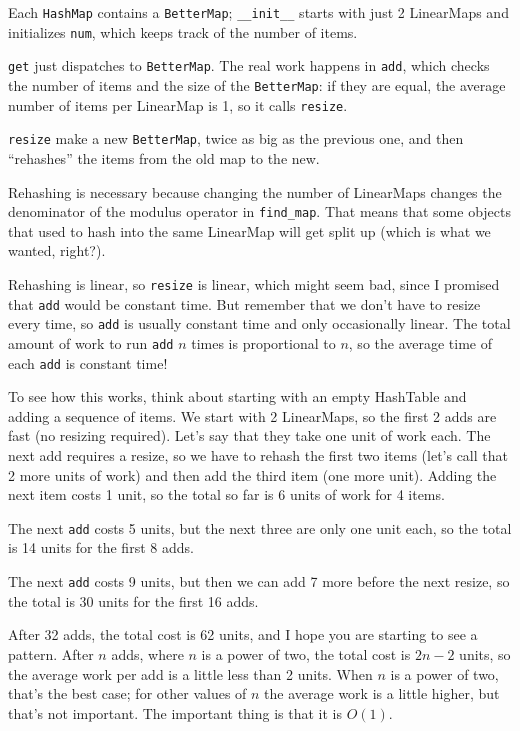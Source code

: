 \documentclass[10pt]{book}
\begin{document}
Each {\tt HashMap} contains a {\tt BetterMap}; \verb"__init__" starts
with just 2 LinearMaps and initializes {\tt num}, which keeps track of
the number of items.

{\tt get} just dispatches to {\tt BetterMap}.  The real work happens
in {\tt add}, which checks the number of items and the size of the
{\tt BetterMap}: if they are equal, the average number of items per
LinearMap is 1, so it calls {\tt resize}.

{\tt resize} make a new {\tt BetterMap}, twice as big as the previous
one, and then ``rehashes'' the items from the old map to the new.

Rehashing is necessary because changing the number of LinearMaps
changes the denominator of the modulus operator in
\verb"find_map".  That means that some objects that used
to hash into the same LinearMap will get split up (which is
what we wanted, right?).

Rehashing is linear, so
{\tt resize} is linear, which might seem bad, since I promised
that {\tt add} would be constant time.  But remember that
we don't have to resize every time, so {\tt add} is usually
constant time and only occasionally linear.  The total amount
of work to run {\tt add} $n$ times is proportional to $n$,
so the average time of each {\tt add} is constant time!

To see how this works, think about starting with an empty
HashTable and adding a sequence of items.  We start with 2 LinearMaps,
so the first 2 adds are fast (no resizing required).  Let's
say that they take one unit of work each.  The next add
requires a resize, so we have to rehash the first two
items (let's call that 2 more units of work) and then
add the third item (one more unit).  Adding the next item
costs 1 unit, so the total so far is
6 units of work for 4 items.

The next {\tt add} costs 5 units, but the next three
are only one unit each, so the total is 14 units for the
first 8 adds.

The next {\tt add} costs 9 units, but then we can add 7 more
before the next resize, so the total is 30 units for the
first 16 adds.

After 32 adds, the total cost is 62 units, and I hope you are starting
to see a pattern.  After $n$ adds, where $n$ is a power of two, the
total cost is $2n-2$ units, so the average work per add is
a little less than 2 units.  When $n$ is a power of two, that's
the best case; for other values of $n$ the average work is a little
higher, but that's not important.  The important thing is that it
is $O(1)$.
\end{document}
